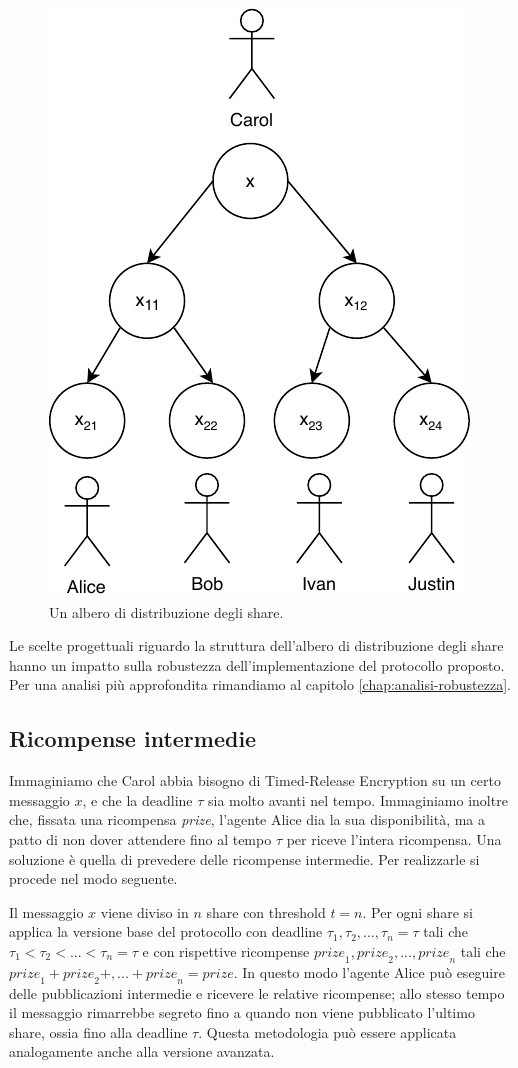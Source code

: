\begin{figure}[H]
	\centering
	\includegraphics[width=0.45\linewidth]{images/chap_protocollo/protocollo-gerarchia.pdf}
	\caption{Un albero di distribuzione degli share.}
\end{figure}

Le scelte progettuali riguardo la struttura dell'albero di distribuzione degli share hanno un
impatto sulla robustezza dell'implementazione del protocollo proposto. Per una analisi più
approfondita rimandiamo al capitolo \ref{chap:analisi-robustezza}.

\subsection{Ricompense intermedie}
Immaginiamo che Carol abbia bisogno di Timed-Release Encryption su un certo messaggio $ x $, e
che la deadline $ \tau $ sia molto avanti nel tempo.
Immaginiamo inoltre che, fissata una ricompensa \textit{prize},
l'agente Alice dia la sua disponibilità, ma a patto di non dover attendere fino al tempo $ \tau $
per riceve l'intera
ricompensa. Una soluzione è quella di prevedere delle ricompense intermedie.
Per realizzarle si procede nel modo seguente.

Il messaggio $ x $ viene diviso in $ n $ share con threshold $ t = n $.
Per ogni share si applica la versione base del protocollo
con deadline $ \tau_1, \tau_2, ... , \tau_n = \tau $
tali che $ \tau_1 < \tau_2 < ... < \tau_n = \tau $ e con rispettive ricompense
$ \textit{prize}_1, \textit{prize}_2, ..., \textit{prize}_n $ tali che
$ \textit{prize}_1 + \textit{prize}_2 +, ... + \textit{prize}_n = \textit{prize} $.
In questo modo l'agente Alice può eseguire delle pubblicazioni intermedie e ricevere le relative
ricompense; allo stesso tempo il messaggio rimarrebbe segreto fino a quando non viene pubblicato
l'ultimo share, ossia fino alla deadline $ \tau $.
Questa metodologia può essere applicata analogamente anche alla versione avanzata.

